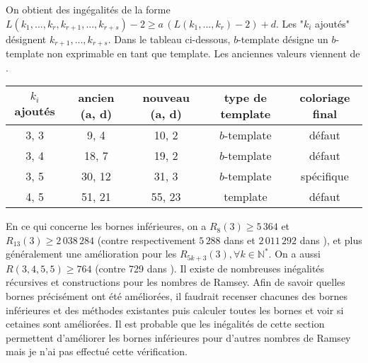 \documentclass{article}
\begin{document}
On obtient des ingégalités de la forme \(L(k_1, ..., k_r, k_{r+1}, ..., k_{r+s}) - 2 \geqslant a \, (L(k_1, ..., k_r) - 2) + d\). Les "\(k_i\) ajoutés" désignent \( k_{r+1}, ..., k_{r+s}\). Dans le tableau ci-dessous, \(b\)-template désigne un \(b\)-template non exprimable en tant que template. Les anciennes valeurs viennent de \cite{rowleyramseysat}.
\begin{table}[H]\begin{center}
\begin{tabular}{| c | c | c | c | c |}
	\hline
	\(k_i\) ajoutés & ancien (a, d) & nouveau (a, d) & type de template & coloriage final \\
	\hline
	3, 3 & 9, 4 & 10, 2 & \(b\)-template & défaut \\
	\hline
	3, 4 & 18, 7 & 19, 2 & \(b\)-template & défaut \\
	\hline
	3, 5 & 30, 12 & 31, 3 & \(b\)-template & spécifique \\
	\hline
	4, 5 & 51, 21 & 55, 23 & template & défaut \\
	\hline
\end{tabular}
\end{center}\end{table}

En ce qui concerne les bornes inférieures, on a  \(R_8(3) \geqslant 5\,364\) et \(R_{13}(3)\geqslant 2\,038\,284\) (contre respectivement \(5\,288\) dans \cite{RowleyRamsey} et \(2\,011\,292\) dans \cite{schurboyz}), et plus généralement une amélioration pour les \(R_{5 k + 3}(3), \forall k \in \mathbb{N}^*\). On a aussi \(R(3 , 4 , 5 , 5) \geqslant 764\) (contre 729 dans \cite{rowleyramseysat}). Il existe de nombreuses inégalités récursives et constructions pour les nombres de Ramsey. Afin de savoir quelles bornes précisément ont été améliorées, il faudrait recenser chacunes des bornes inférieures et des méthodes existantes puis calculer toutes les bornes et voir si cetaines sont améliorées. Il est probable que les inégalités de cette section permettent d'améliorer les bornes inférieures pour d'autres nombres de Ramsey mais je n'ai pas effectué cette vérification.



\end{document}
